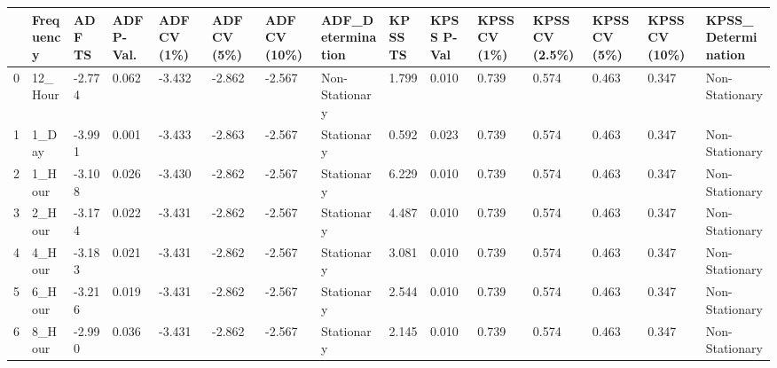 \begin{tabular}{lllllllllllllll}
\toprule
 & Frequency & ADF TS & ADF P-Val. & ADF CV (1\%) & ADF CV (5\%) & ADF CV (10\%) & ADF_Determination & KPSS TS & KPSS P-Val & KPSS CV (1\%) & KPSS CV (2.5\%) & KPSS CV (5\%) & KPSS CV (10\%) & KPSS_Determination \\
\midrule
0 & 12_Hour & -2.774 & 0.062 & -3.432 & -2.862 & -2.567 & Non-Stationary & 1.799 & 0.010 & 0.739 & 0.574 & 0.463 & 0.347 & Non-Stationary \\
1 & 1_Day & -3.991 & 0.001 & -3.433 & -2.863 & -2.567 & Stationary & 0.592 & 0.023 & 0.739 & 0.574 & 0.463 & 0.347 & Non-Stationary \\
2 & 1_Hour & -3.108 & 0.026 & -3.430 & -2.862 & -2.567 & Stationary & 6.229 & 0.010 & 0.739 & 0.574 & 0.463 & 0.347 & Non-Stationary \\
3 & 2_Hour & -3.174 & 0.022 & -3.431 & -2.862 & -2.567 & Stationary & 4.487 & 0.010 & 0.739 & 0.574 & 0.463 & 0.347 & Non-Stationary \\
4 & 4_Hour & -3.183 & 0.021 & -3.431 & -2.862 & -2.567 & Stationary & 3.081 & 0.010 & 0.739 & 0.574 & 0.463 & 0.347 & Non-Stationary \\
5 & 6_Hour & -3.216 & 0.019 & -3.431 & -2.862 & -2.567 & Stationary & 2.544 & 0.010 & 0.739 & 0.574 & 0.463 & 0.347 & Non-Stationary \\
6 & 8_Hour & -2.990 & 0.036 & -3.431 & -2.862 & -2.567 & Stationary & 2.145 & 0.010 & 0.739 & 0.574 & 0.463 & 0.347 & Non-Stationary \\
\bottomrule
\end{tabular}
